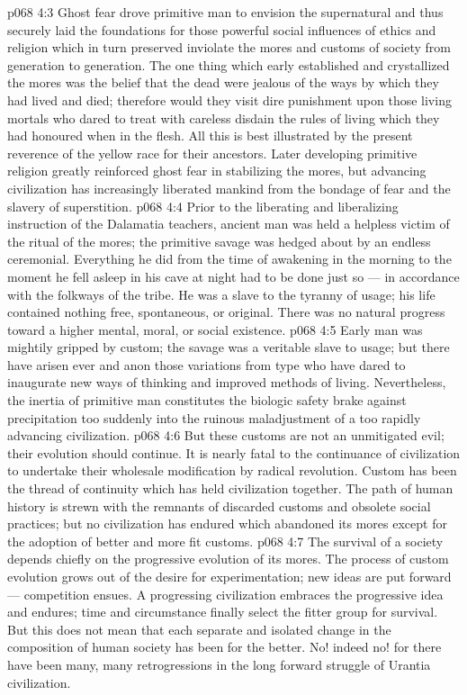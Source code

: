 \vs p068 4:3 \pc Ghost fear drove primitive man to envision the supernatural and thus securely laid the foundations for those powerful social influences of ethics and religion which in turn preserved inviolate the mores and customs of society from generation to generation. The one thing which early established and crystallized the mores was the belief that the dead were jealous of the ways by which they had lived and died; therefore would they visit dire punishment upon those living mortals who dared to treat with careless disdain the rules of living which they had honoured when in the flesh. All this is best illustrated by the present reverence of the yellow race for their ancestors. Later developing primitive religion greatly reinforced ghost fear in stabilizing the mores, but advancing civilization has increasingly liberated mankind from the bondage of fear and the slavery of superstition.
\vs p068 4:4 Prior to the liberating and liberalizing instruction of the Dalamatia teachers, ancient man was held a helpless victim of the ritual of the mores; the primitive savage was hedged about by an endless ceremonial. Everything he did from the time of awakening in the morning to the moment he fell asleep in his cave at night had to be done just so --- in accordance with the folkways of the tribe. He was a slave to the tyranny of usage; his life contained nothing free, spontaneous, or original. There was no natural progress toward a higher mental, moral, or social existence.
\vs p068 4:5 Early man was mightily gripped by custom; the savage was a veritable slave to usage; but there have arisen ever and anon those variations from type who have dared to inaugurate new ways of thinking and improved methods of living. Nevertheless, the inertia of primitive man constitutes the biologic safety brake against precipitation too suddenly into the ruinous maladjustment of a too rapidly advancing civilization.
\vs p068 4:6 But these customs are not an unmitigated evil; their evolution should continue. It is nearly fatal to the continuance of civilization to undertake their wholesale modification by radical revolution. Custom has been the thread of continuity which has held civilization together. The path of human history is strewn with the remnants of discarded customs and obsolete social practices; but no civilization has endured which abandoned its mores except for the adoption of better and more fit customs.
\vs p068 4:7 The survival of a society depends chiefly on the progressive evolution of its mores. The process of custom evolution grows out of the desire for experimentation; new ideas are put forward --- competition ensues. A progressing civilization embraces the progressive idea and endures; time and circumstance finally select the fitter group for survival. But this does not mean that each separate and isolated change in the composition of human society has been for the better. No! indeed no! for there have been many, many retrogressions in the long forward struggle of Urantia civilization.
